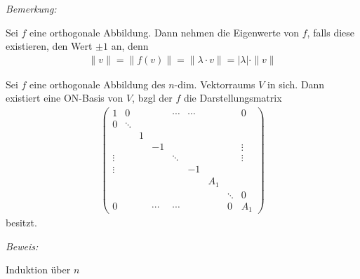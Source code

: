
\textit{Bemerkung:}\medskip

Sei $f$ eine orthogonale Abbildung. Dann nehmen die Eigenwerte von $f$, falls diese existieren, den Wert $\pm 1$ an, denn
\begin{align*}
    \| v \| = \| f(v) \| = \| \lambda \cdot v\| = | \lambda | \cdot \| v \|
\end{align*}


\begin{mysatz}
    Sei $f$ eine orthogonale Abbildung des $n$-dim. Vektorraums $V$ in sich.
    Dann existiert eine ON-Basis von $V$, bzgl der $f$ die Darstellungsmatrix
    \begin{align*}
        \begin{pmatrix}
            1 & 0 & & & \cdots &\cdots & & & 0 \\
            0 & \ddots & & & & & & & \\
            & & 1 & & & & & & \\
            & & & -1 & & & & & \vdots \\
            \vdots & & & & \ddots & & &  &\vdots \\
            \vdots & & & & & -1 & & & \\
            & & & & & & A_1 & & \\
            & & & & & & & \ddots & 0 \\
            0 & & & \cdots & \cdots & & & 0 & A_1
        \end{pmatrix}
    \end{align*}
    besitzt.

    \textit{Beweis:} \medskip

    Induktion über $n$
\end{mysatz}
